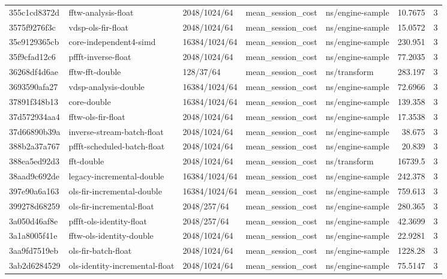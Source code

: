 \begin{longtable}{lllllrr}
355c1cd8372d & fftw-analysis-float & 2048/1024/64 & mean\_session\_cost & ns/engine-sample & 10.7675 & 3 \\
3575f9276f3c & vdsp-ols-fir-float & 2048/1024/64 & mean\_session\_cost & ns/engine-sample & 15.0572 & 3 \\
35e9129365cb & core-independent4-simd & 16384/1024/64 & mean\_session\_cost & ns/engine-sample & 230.951 & 3 \\
35f9cfad12c6 & pffft-inverse-float & 2048/1024/64 & mean\_session\_cost & ns/engine-sample & 77.2035 & 3 \\
36268df4d6ae & fftw-fft-double & 128/37/64 & mean\_session\_cost & ns/transform & 283.197 & 3 \\
3693590afa27 & vdsp-analysis-double & 16384/1024/64 & mean\_session\_cost & ns/engine-sample & 72.6966 & 3 \\
37891f348b13 & core-double & 16384/1024/64 & mean\_session\_cost & ns/engine-sample & 139.358 & 3 \\
37d572934aa4 & fftw-ols-fir-float & 2048/1024/64 & mean\_session\_cost & ns/engine-sample & 17.3538 & 3 \\
37d66890b39a & inverse-stream-batch-float & 2048/1024/64 & mean\_session\_cost & ns/engine-sample & 38.675 & 3 \\
388b2a37a767 & pffft-scheduled-batch-float & 2048/1024/64 & mean\_session\_cost & ns/engine-sample & 20.839 & 3 \\
388ea5ed92d3 & fft-double & 2048/1024/64 & mean\_session\_cost & ns/transform & 16739.5 & 3 \\
38aad9c692de & legacy-incremental-double & 16384/1024/64 & mean\_session\_cost & ns/engine-sample & 242.378 & 3 \\
397e90a6a163 & ols-fir-incremental-double & 16384/1024/64 & mean\_session\_cost & ns/engine-sample & 759.613 & 3 \\
399278d68259 & ols-fir-incremental-float & 2048/257/64 & mean\_session\_cost & ns/engine-sample & 280.365 & 3 \\
3a050d46af8e & pffft-ols-identity-float & 2048/257/64 & mean\_session\_cost & ns/engine-sample & 42.3699 & 3 \\
3a1a8005f41e & fftw-ols-identity-double & 2048/1024/64 & mean\_session\_cost & ns/engine-sample & 22.9281 & 3 \\
3aa9fd7519eb & ols-fir-batch-float & 2048/1024/64 & mean\_session\_cost & ns/engine-sample & 1228.28 & 3 \\
3ab2d6284529 & ols-identity-incremental-float & 2048/1024/64 & mean\_session\_cost & ns/engine-sample & 75.5147 & 3 \\

\end{longtable}
